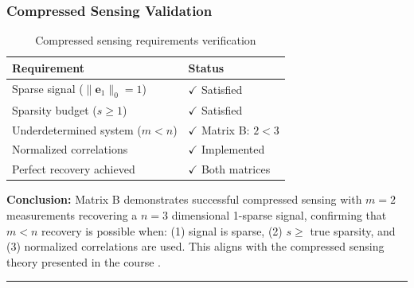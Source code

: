 \vspace{1em}

\subsubsection*{Compressed Sensing Validation}

\begin{table}[h]
\centering
\begin{tabular}{ll}
\toprule
\textbf{Requirement} & \textbf{Status} \\
\midrule
Sparse signal ($\|\mathbf{e}_1\|_0 = 1$) & $\checkmark$ Satisfied \\
Sparsity budget ($s \geq 1$) & $\checkmark$ Satisfied \\
Underdetermined system ($m < n$) & $\checkmark$ Matrix B: $2 < 3$ \\
Normalized correlations & $\checkmark$ Implemented \\
Perfect recovery achieved & $\checkmark$ Both matrices \\
\bottomrule
\end{tabular}
\caption{Compressed sensing requirements verification}
\end{table}

\textbf{Conclusion:} Matrix B demonstrates successful compressed sensing with $m=2$ measurements recovering a $n=3$ dimensional 1-sparse signal, confirming that $m < n$ recovery is possible when: (1) signal is sparse, (2) $s \geq$ true sparsity, and (3) normalized correlations are used. This aligns with the compressed sensing theory presented in the course \cite{panchenko_448_notes}.

\vspace{2em}
\noindent\rule{\textwidth}{0.4pt}
